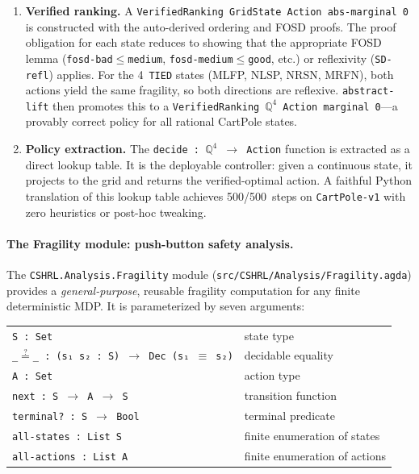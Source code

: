 \documentclass[9pt,a4paper]{article}
\newcommand{\fpath}[1]{\nolinkurl{#1}}
\theoremstyle{plain}
\theoremstyle{definition}
\theoremstyle{remark}
\begin{document}
\begin{enumerate}
\item \textbf{Verified ranking.}  A \texttt{VerifiedRanking~GridState~Action~abs-marginal~0} is constructed with the auto-derived ordering and FOSD proofs.  The proof obligation for each state reduces to showing that the appropriate FOSD lemma (\texttt{fosd-bad$\le$medium}, \texttt{fosd-medium$\le$good}, etc.) or reflexivity (\texttt{SD-refl}) applies.  For the 4~\texttt{TIED} states (MLFP, NLSP, NRSN, MRFN), both actions yield the same fragility, so both directions are reflexive.  \texttt{abstract-lift} then promotes this to a \texttt{VerifiedRanking}~$\mathbb{Q}^4$~\texttt{Action}~\texttt{marginal}~\texttt{0}---a provably correct policy for all rational CartPole states.

\item \textbf{Policy extraction.}  The \texttt{decide~:~$\mathbb{Q}^4$~$\to$~Action} function is extracted as a direct lookup table.  It is the deployable controller: given a continuous state, it projects to the grid and returns the verified-optimal action.  A faithful Python translation of this lookup table achieves 500/500~steps on \texttt{CartPole-v1} with zero heuristics or post-hoc tweaking.
\end{enumerate}

\paragraph{The Fragility module: push-button safety analysis.}
The \texttt{CSHRL.Analysis.Fragility} module (\fpath{src/CSHRL/Analysis/Fragility.agda}) provides a \emph{general-purpose}, reusable fragility computation for any finite deterministic MDP.  It is parameterized by seven arguments:

\smallskip
\begin{center}
\begin{tabular}{ll}
\texttt{S~:~Set}                   & state type \\
\texttt{\_$\stackrel{?}{=}$\_~:~(s₁~s₂~:~S)~$\to$~Dec~(s₁~$\equiv$~s₂)} & decidable equality \\
\texttt{A~:~Set}                   & action type \\
\texttt{next~:~S~$\to$~A~$\to$~S} & transition function \\
\texttt{terminal?~:~S~$\to$~Bool}  & terminal predicate \\
\texttt{all-states~:~List~S}       & finite enumeration of states \\
\texttt{all-actions~:~List~A}      & finite enumeration of actions
\end{tabular}
\end{center}
\smallskip
\end{document}
